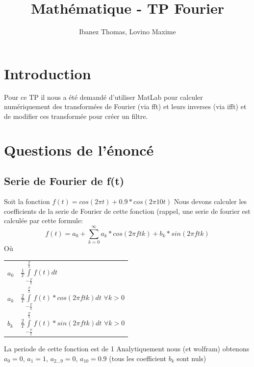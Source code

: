 \documentclass[a4paper,11pt]{article}
\title{Mathématique - TP Fourier}
\author{Ibanez Thomas, Lovino Maxime}
\makeatletter
\newenvironment{conditions}
  {\par\vspace{\abovedisplayskip}\noindent\begin{tabular}{>{$}l<{$} @{${}={}$} l}}
  {\end{tabular}\par\vspace{\belowdisplayskip}}
\makeatother
\begin{document}
\maketitle
\section{Introduction}
Pour ce TP il nous a été demandé d'utiliser MatLab pour calculer numériquement des transformées de Fourier (via fft) et leurs inverses (via ifft) et de modifier ces transformée pour créer un filtre.
\section{Questions de l'énoncé}

\subsection{Serie de Fourier de f(t)}
Soit la fonction $f(t) = cos(2\pi t) + 0.9*cos(2\pi 10t)$ \newline
Nous devons calculer les coefficients de la serie de Fourier de cette fonction (rappel, une serie de fourier est calculée par cette formule: 
\begin{equation*}
f(t) = a_0 + \sum_{k=0}^\infty a_k * cos(2\pi f tk) + b_k * sin(2\pi f tk)
\end{equation*}
Où
\begin{conditions}
a_0 &  $\frac{1}{T} \int\limits_{-\frac{T}{2}}^{\frac{T}{2}}  f(t) dt $ \\
a_k &  $\frac{2}{T} \int\limits_{-\frac{T}{2}}^{\frac{T}{2}} f(t) * cos(2\pi ftk) dt$ $ \forall k > 0$\\
b_k & $\frac{2}{T} \int\limits_{-\frac{T}{2}}^{\frac{T}{2}} f(t) * sin(2\pi ftk) dt$ $ \forall k > 0$
\end{conditions}
La periode de cette fonction est de 1 \newline
Analytiquement nous (et wolfram) obtenons
$a_0 = 0$, $a_1 = 1$, $a_{2...9} = 0$, $a_{10} = 0.9$ (tous les coefficient $b_k$ sont nuls)
\end{document}
